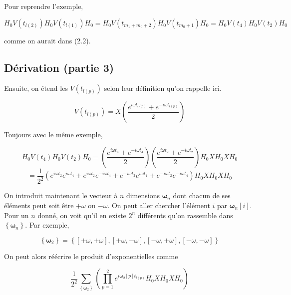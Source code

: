 Pour reprendre l'exemple, 

\begin{equation*}
    H_0V(t_{l(2)})H_0V(t_{l(1)})H_0 = H_0V(t_{m_1 + m_0 + 2})H_0V(t_{m_0 + 1})H_0 = H_0V(t_4)H_0V(t_2)H_0
\end{equation*}

comme on aurait dans (2.2).

\subsection{Dérivation (partie 3)}
Ensuite, on étend les $V(t_{l(p)})$ selon leur définition qu'on rappelle ici.

\begin{equation*}
    V(t_{l(p)}) = X\left(\frac{e^{i\omega t_{l(p)}} + e^{-i\omega t_{l(p)}}}{2}\right)
\end{equation*}

Toujours avec le même exemple,

\begin{equation*}
    H_0V(t_4)H_0V(t_2)H_0 = \left(\frac{e^{i\omega t_4} + e^{-i\omega t_4}}{2}\right)\left(\frac{e^{i\omega t_2} + e^{-i\omega t_2}}{2}\right)H_0XH_0XH_0 
\end{equation*}
\begin{equation*}
    = \frac{1}{2^2}\left(e^{i\omega t_2}e^{i\omega t_4} + e^{i\omega t_2}e^{-i\omega t_4} + e^{-i\omega t_2}e^{i\omega t_4} + e^{-i\omega t_2}e^{-i\omega t_4}\right)H_0XH_0XH_0
\end{equation*}

On introduit maintenant le vecteur à $n$ dimensions $\boldsymbol{\omega}_n$ dont chacun de ses éléments peut soit être $+\omega$ ou $-\omega$. On peut aller chercher l'élément $i$ par $\boldsymbol{\omega}_n[i]$. Pour un $n$ donné, on voit qu'il en existe $2^n$ différents qu'on rassemble dans $\left\{\boldsymbol{\omega}_n\right\}$. Par exemple, 

\begin{equation*}
    \left\{\boldsymbol{\omega}_2\right\} = \left\{\left[+\omega, +\omega\right], \left[+\omega, -\omega\right], \left[-\omega, +\omega\right], \left[-\omega, -\omega\right]\right\}    
\end{equation*}

On peut alors réécrire le produit d'exponentielles comme

\begin{equation*}
    \frac{1}{2^2}\sum_{\left\{\boldsymbol{\omega}_2\right\}}\left(\prod_{p=1}^{2}e^{i\boldsymbol{\omega}_2[p]t_{l(p)}} H_0XH_0XH_0\right)
\end{equation*}

